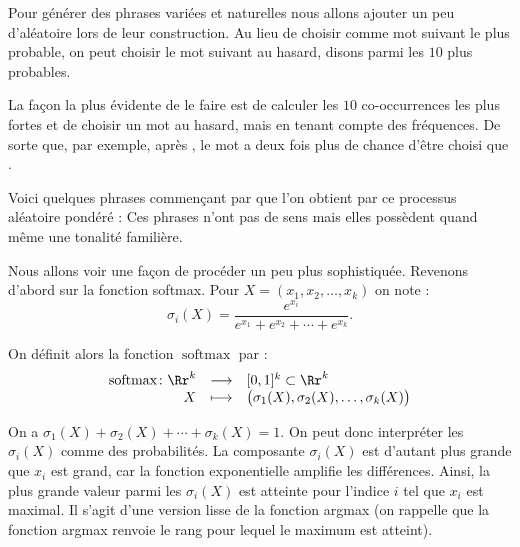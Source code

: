 \documentclass[11pt,class=report,crop=false]{standalone}
\begin{document}
Pour générer des phrases variées et naturelles nous allons ajouter un peu d'aléatoire lors de leur construction. Au lieu de choisir comme mot suivant le plus probable, on peut choisir le mot suivant au hasard, disons parmi les $10$ plus probables.

La façon la plus évidente de le faire est de calculer les $10$ co-occurrences les plus fortes et de choisir un mot au hasard, mais en tenant compte des fréquences. De sorte que, par exemple, après , le mot  a deux fois plus de chance d'être choisi que .

Voici quelques phrases commençant par  que l'on obtient par ce processus aléatoire pondéré :
Ces phrases n'ont pas de sens mais elles possèdent quand même une tonalité familière.


\bigskip

Nous allons voir une façon de procéder un peu plus sophistiquée.
Revenons d'abord sur la fonction softmax.
Pour $X = (x_1,x_2,\ldots,x_k)$ on note :
$$\sigma_i(X)  = \frac{e^{x_i}}{ e^{x_1} + e^{x_2} + \cdots + e^{x_k}}.$$



On définit alors la fonction $\operatorname{softmax}$ par :
$$\begin{array}{rcl}
	\operatorname{softmax} \colon \Rr^k & \longrightarrow & [0,1]^k \subset \Rr^k \\
	X &\longmapsto & \big(\sigma_1(X), \sigma_2(X), \dots, \sigma_k(X)\big)
\end{array}
$$

On a $\sigma_1(X) + \sigma_2(X) + \cdots + \sigma_k(X) = 1$.
On peut donc interpréter les $\sigma_i(X)$ comme des probabilités.
La composante \(\sigma_i(X)\) est d’autant plus grande que \(x_i\) est grand, car la fonction exponentielle amplifie les différences.  
Ainsi, la plus grande valeur parmi les \(\sigma_i(X)\) est atteinte pour l’indice \(i\) tel que \(x_i\) est maximal.
Il s'agit d'une version \og{}lisse\fg{} de la fonction argmax (on rappelle que la fonction argmax renvoie le rang pour lequel le maximum est atteint).
\end{document}
